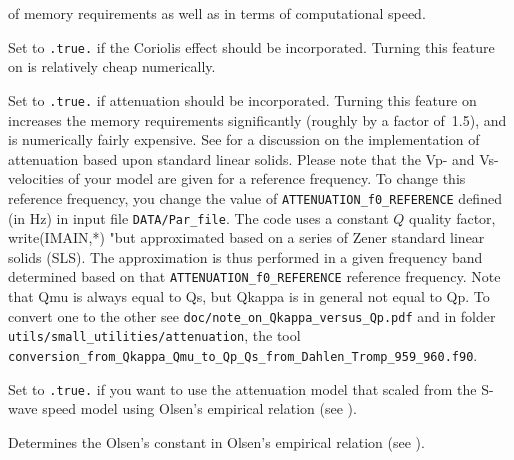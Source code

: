 \begin{description}
of memory requirements as well as in terms of computational speed.
%
\item [{\texttt{ROTATION}}] Set to \texttt{.true.} if the Coriolis effect
should be incorporated. Turning this feature on is relatively cheap
numerically.
%
\item [{\texttt{ATTENUATION}}] Set to \texttt{.true.} if attenuation should
be incorporated. Turning this feature on increases the memory requirements
significantly (roughly by a factor of~1.5), and is numerically fairly
expensive. See \citet{KoTr99,KoTr02a} for a discussion on the implementation
of attenuation based upon standard linear solids. Please note that
the Vp- and Vs-velocities of your model are given for a reference
frequency. To change this reference frequency, you change the value
of \texttt{ATTENUATION\_f0\_REFERENCE} defined (in Hz) in input file \texttt{DATA/Par\_file}.
The code uses a constant $Q$ quality factor, write(IMAIN,*) "but approximated based on a series of Zener standard linear solids (SLS).
The approximation is thus performed in a given frequency band determined based on that \texttt{ATTENUATION\_f0\_REFERENCE} reference frequency.
Note that Qmu is always equal to Qs, but Qkappa is in general not equal to Qp.
To convert one to the other see \texttt{doc/note\_on\_Qkappa\_versus\_Qp.pdf}
and in folder \texttt{utils/small\_utilities/attenuation}, the tool
\texttt{conversion\_from\_Qkappa\_Qmu\_to\_Qp\_Qs\_from\_Dahlen\_Tromp\_959\_960.f90}.
%
\item [{\texttt{USE\_OLSEN\_ATTENUATION}}] Set to \texttt{.true.} if you
want to use the attenuation model that scaled from the S-wave speed
model using Olsen's empirical relation (see \citet{OlDaBr03}).
%
\item [{\texttt{OLSEN\_ATTENUATION\_RATIO}}] Determines the Olsen's constant
in Olsen's empirical relation (see \citet{OlDaBr03}).
\end{description}

